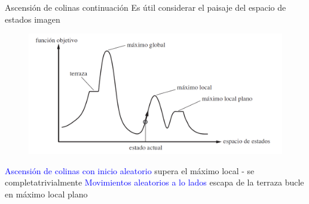 \begin{frame}{Ascensión de colinas continuación}
Es útil considerar el paisaje del espacio de estados imagen \newline
    \begin{figure}[t]
        \includegraphics[scale = 0.2]{4b_function.png}
    \end{figure}
\textcolor{blue}{Ascensión de colinas con inicio aleatorio} supera el máximo local - se completatrivialmente \newline
\textcolor{blue}{Movimientos aleatorios a lo lados} \Frowny{} escapa de la terraza  \Smiley{} bucle en máximo local plano
\end{frame}
